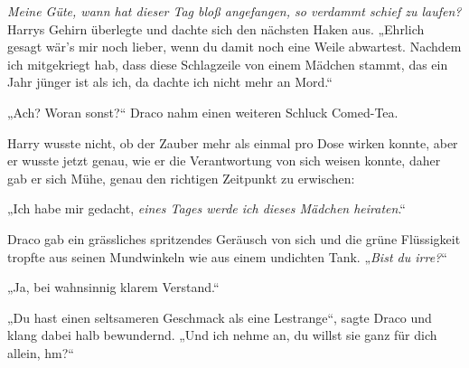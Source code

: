 
\emph{Meine Güte, wann hat dieser Tag bloß angefangen, so verdammt schief zu laufen?} Harrys Gehirn überlegte und dachte sich den nächsten Haken aus. „Ehrlich gesagt wär’s mir noch lieber, wenn du damit noch eine Weile abwartest. Nachdem ich mitgekriegt hab, dass diese Schlagzeile von einem Mädchen stammt, das ein Jahr jünger ist als ich, da dachte ich nicht mehr an Mord.“

„Ach? Woran sonst?“ Draco nahm einen weiteren Schluck Comed-Tea.

Harry wusste nicht, ob der Zauber mehr als einmal pro Dose wirken konnte, aber er wusste jetzt genau, wie er die Verantwortung von sich weisen konnte, daher gab er sich Mühe, genau den richtigen Zeitpunkt zu erwischen:

„Ich habe mir gedacht, \emph{eines Tages werde ich dieses Mädchen heiraten}.“

Draco gab ein grässliches spritzendes Geräusch von sich und die grüne Flüssigkeit tropfte aus seinen Mundwinkeln wie aus einem undichten Tank. „\emph{Bist du irre?}“

„Ja, bei wahnsinnig klarem Verstand.“

„Du hast einen seltsameren Geschmack als eine Lestrange“, sagte Draco und klang dabei halb bewundernd. „Und ich nehme an, du willst sie ganz für dich allein, hm?“

